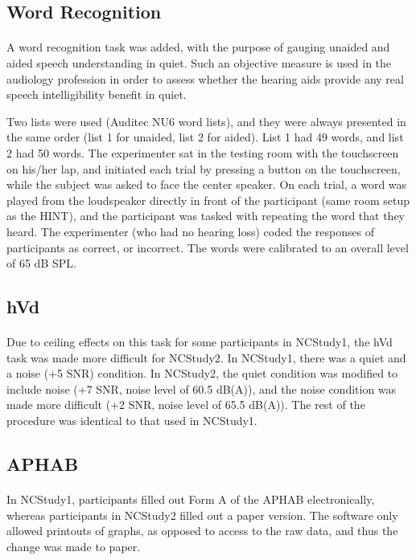 \subsection{Word Recognition}
\paragraph{}A word recognition task was added, with the purpose of gauging unaided and aided speech understanding in quiet.  Such an objective measure is used in the audiology profession in order to assess whether the hearing aids provide any real speech intelligibility benefit in quiet.

Two lists were used (Auditec NU6 word lists), and they were always presented in the same order (list 1 for unaided, list 2 for aided).  List 1 had 49 words, and list 2 had 50 words.  The experimenter sat in the testing room with the touchscreen on his/her lap, and initiated each trial by pressing a button on the touchscreen, while the subject was asked to face the center speaker.  On each trial, a word was played from the loudspeaker directly in front of the participant (same room setup as the HINT), and the participant was tasked with repeating the word that they heard.  The experimenter (who had no hearing loss) coded the responses of participants as correct, or incorrect.  The words were calibrated to an overall level of 65 dB SPL.

\subsection{hVd}
\paragraph{}Due to ceiling effects on this task for some participants in NCStudy1, the hVd task was made more difficult for NCStudy2.  In NCStudy1, there was a quiet and a noise (+5 SNR) condition.  In NCStudy2, the quiet condition was modified to include noise (+7 SNR, noise level of 60.5 dB(A)), and the noise condition was made more difficult (+2 SNR, noise level of 65.5 dB(A)).  The rest of the procedure was identical to that used in NCStudy1.

\subsection{APHAB}
\paragraph{}In NCStudy1, participants filled out Form A of the APHAB electronically, whereas participants in NCStudy2 filled out a paper version.  The software only allowed printouts of graphs, as opposed to access to the raw data, and thus the change was made to paper.

